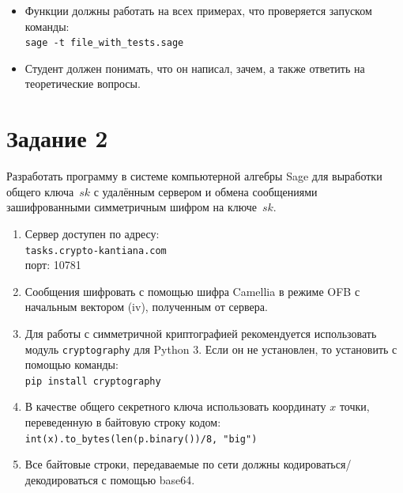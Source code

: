 \documentclass[11pt]{exam}
\theoremstyle{definition}
\begin{document}
{\begin{itemize}
        \texttt{\# your code here.}
        
        на код, реализующий функцию.
        \item Функции должны работать на всех примерах, что проверяется запуском команды:
        \\\texttt{sage -t file\_with\_tests.sage}
        \item Студент должен понимать, что он написал, зачем, а также ответить на теоретические вопросы.
    \end{itemize}
    
    
    \section*{Задание 2}
    
    	Разработать программу в системе компьютерной алгебры Sage для выработки общего ключа~$sk$ с удалённым сервером и обмена сообщениями зашифрованными симметричным шифром на ключе~$sk$.
    
    \begin{enumerate}
    	\item Сервер доступен по адресу:\\
    	\texttt{tasks.crypto-kantiana.com}\\
    	порт: 10781
    	
    	\item Сообщения шифровать с помощью шифра Camellia в режиме OFB с начальным вектором (iv), полученным от сервера.
    	
    	\item Для работы с симметричной криптографией рекомендуется использовать модуль \texttt{cryptography} для Python 3. Если он не установлен, то установить с помощью команды:\\
    	\texttt{pip install cryptography}
    	
    	\item В качестве общего секретного ключа использовать координату $x$ точки, переведенную в байтовую строку кодом:\\
    	\texttt{int(x).to\_bytes(len(p.binary())/8, "big")}
    	
    	\item Все байтовые строки, передаваемые по сети должны кодироваться/декодироваться с помощью base64.
    \end{enumerate}
    
}
\end{document}
